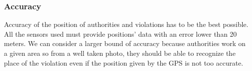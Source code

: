 \subsubsection{Accuracy}
Accuracy of the position of authorities and violations has to be the best possible. All the sensors used must provide positions' data with an error lower than 20 meters. We can consider a larger bound of accuracy because authorities work on a given area so from a well taken photo, they should be able to recognize the place of the violation even if the position given by the GPS is not too accurate.










